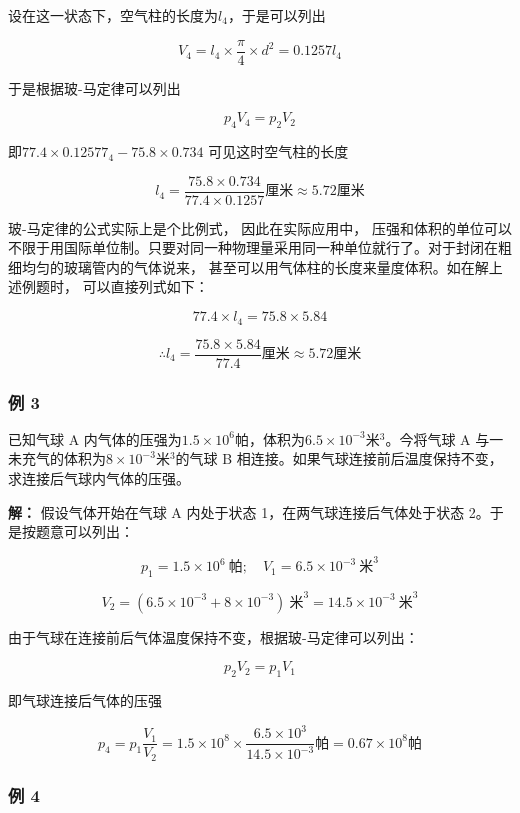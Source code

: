 设在这一状态下，空气柱的长度为\(l_{4}\)，于是可以列出

\[
V _ {4} = l _ {4} \times \frac {\pi}{4} \times d ^ {2} = 0.1257 l _ {4}
\]

于是根据玻-马定律可以列出

\[
p_4V_4=p_2V_2
\]

即\(77.4 \times 0.12577_{4} - 75.8 \times 0.734\) 可见这时空气柱的长度

\[
l _ {4} = \frac {75.8 \times 0.734}{77.4 \times 0.1257} \text{厘米} \approx 5.72 \text{厘米}
\]

玻-马定律的公式实际上是个比例式， 因此在实际应用中，
压强和体积的单位可以不限于用国际单位制。只要对同一种物理量采用同一种单位就行了。对于封闭在粗细均匀的玻璃管内的气体说来，
甚至可以用气体柱的长度来量度体积。如在解上述例题时， 可以直接列式如下：

\[
77.4 \times l _ {4} = 75.8 \times 5.84
\]

\[
\therefore l _ {4} = \frac {75.8 \times 5.84}{77.4} \text{厘米} \approx 5.72 \text{厘米}
\]

\subsubsection{例 3}\label{ux4f8b-3-4}

已知气球 A
内气体的压强为\(1.5 \times 10^{6}\)帕，体积为\(6.5 \times 10^{-3}\)米\(^{3}\)。今将气球
A 与一未充气的体积为\(8 \times 10^{-3}\)米\(^{3}\)的气球 B
相连接。如果气球连接前后温度保持不变，求连接后气球内气体的压强。

\textbf{解：} 假设气体开始在气球 A 内处于状态
1，在两气球连接后气体处于状态 2。于是按题意可以列出：

\[
p_1=1.5\times10^6\ \text{帕};\quad V_1=6.5\times10^{-3}\ \text{米}^3
\]

\[
V_2=(6.5\times10^{-3}+8\times10^{-3})\ \text{米}^3=14.5\times10^{-3}\ \text{米}^3
\]

由于气球在连接前后气体温度保持不变，根据玻-马定律可以列出：

\[
p _ {2} V _ {2} = p _ {1} V _ {1}
\]

即气球连接后气体的压强

\[
p _ {4} = p _ {1} \frac {V _ {1}}{V _ {2}} = 1.5 \times 10 ^ {8} \times \frac {6.5 \times 10 ^ {3}}{14.5 \times 10 ^ {- 3}} \text{帕} = 0.67 \times 10 ^ {8} \text{帕}
\]

\subsubsection{例 4}\label{ux4f8b-4-3}

